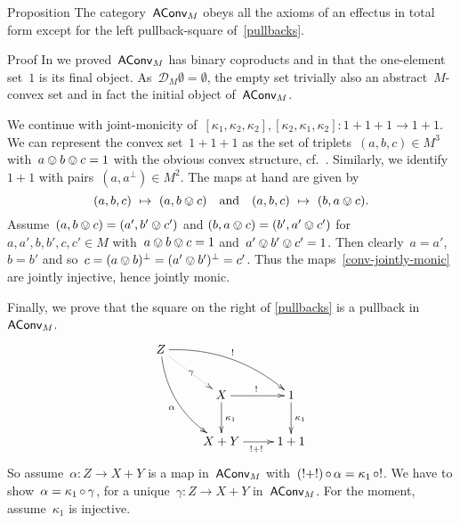 \documentclass[b]{subfiles}
\begin{document}
\begin{parsec}%
\begin{point}[aconvalmosteffectus]{Proposition}%
The category~$\mathsf{AConv}_M$ obeys all the axioms of an effectus in total
form except for the left pullback-square of~\eqref{pullbacks}.
\begin{point}{Proof}%
In  we proved~$\mathsf{AConv}_M$ has binary coproducts
    and in 
    that the one-element set~$1$ is its final object.
As~$\mathcal{D}_M \emptyset = \emptyset$,
    the empty set trivially also an abstract~$M$-convex set
    and in fact the initial object of~$\mathsf{AConv}_M$.
\end{point}
\begin{point}%
We continue with joint-monicity
    of~$[\kappa_1,\kappa_2,\kappa_2],
    [\kappa_2,\kappa_1,\kappa_2]\colon 1+1+1 \to 1+1$.
We can represent the convex set~$1+1+1$
    as the set of triplets~$(a,b,c) \in M^3$
    with~$a\ovee b \ovee c = 1$
    with the obvious convex structure,
    cf.~.
Similarly, we identify~$1+1$
    with pairs~$(a,a^\perp) \in M^2$.
    The maps at hand are given by
\begin{equation}\label{conv-jointly-monic}
    (a,b,c) \ \mapsto\  (a , b\ovee c)\quad \text{and} \quad
    (a,b,c) \ \mapsto\  (b, a\ovee c).
\end{equation}
Assume~$
(a, b \ovee c) = 
(a', b' \ovee c') $
and
$(b, a \ovee c) = 
(b', a' \ovee c') $
for~$a,a',b,b',c,c' \in M$ with~$a \ovee b \ovee c= 1$
and~$a' \ovee b' \ovee c'= 1$.
Then clearly~$a=a'$,~$b=b'$
    and so~$c = (a\ovee b)^\perp = (a' \ovee b')^\perp = c'$.
Thus the maps~\eqref{conv-jointly-monic} are jointly injective,
    hence jointly monic.
\end{point}
\begin{point}%
Finally, we prove that the square on the right of \eqref{pullbacks}
    is a pullback in~$\mathsf{AConv}_M$.
\begin{equation*}
\xymatrix{
    Z \ar@/^1pc/[rrd]^{!}
        \ar@/_1pc/[rdd]_\alpha
        \ar@{.>}[rd]|\gamma\\
        &X \ar[r]^{!} \ar[d]^{\kappa_1}
        & 1\ar[d]^{\kappa_1} \\
        &X+Y\ar[r]_{!+!} & 1+1
    }
\end{equation*}
So assume~$\alpha \colon Z \to X+Y$
    is a map in~$\mathsf{AConv}_M$
    with~$(!+!) \mathop{\circ} \alpha = \kappa_1 \mathop{\circ} !$.
We have to show~$\alpha = \kappa_1 \mathop{\circ} \gamma$,
    for a unique~$\gamma\colon Z \to X+Y$ in~$\mathsf{AConv}_M$.
For the moment, assume~$\kappa_1$ is injective.

\end{point}
\end{point}
\end{parsec}
\end{document}
